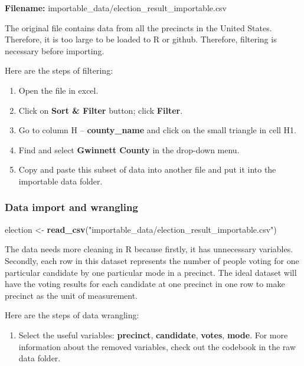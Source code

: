 \documentclass[
]{article}
\newenvironment{Shaded}{\begin{snugshade}}{\end{snugshade}}
\newcommand{\KeywordTok}[1]{\textcolor[rgb]{0.13,0.29,0.53}{\textbf{#1}}}
\newcommand{\NormalTok}[1]{#1}
\newcommand{\StringTok}[1]{\textcolor[rgb]{0.31,0.60,0.02}{#1}}
\providecommand{\tightlist}{%
  \setlength{\itemsep}{0pt}\setlength{\parskip}{0pt}}
\begin{document}
\textbf{Filename:} importable\_data/election\_result\_importable.csv

The original file contains data from all the precincts in the United
States. Therefore, it is too large to be loaded to R or github.
Therefore, filtering is necessary before importing.

Here are the steps of filtering:

\begin{enumerate}
\def\labelenumi{\arabic{enumi}.}
\tightlist
\item
  Open the file in excel.
\item
  Click on \textbf{Sort \& Filter} button; click \textbf{Filter}.
\item
  Go to column H -- \textbf{county\_name} and click on the small
  triangle in cell H1.
\item
  Find and select \textbf{Gwinnett County} in the drop-down menu.
\item
  Copy and paste this subset of data into another file and put it into
  the importable data folder.
\end{enumerate}

\hypertarget{data-import-and-wrangling}{%
\subsubsection{Data import and
wrangling}\label{data-import-and-wrangling}}

\begin{Shaded}
\begin{Highlighting}[]
\NormalTok{election <-}\StringTok{ }\KeywordTok{read_csv}\NormalTok{(}\StringTok{"importable_data/election_result_importable.csv"}\NormalTok{)}
\end{Highlighting}
\end{Shaded}

The data needs more cleaning in R because firstly, it has unnecessary
variables. Secondly, each row in this dataset represents the number of
people voting for one particular candidate by one particular mode in a
precinct. The ideal dataset will have the voting results for each
candidate at one precinct in one row to make precinct as the unit of
measurement.

Here are the steps of data wrangling:

\begin{enumerate}
\def\labelenumi{\arabic{enumi}.}
\tightlist
\item
  Select the useful variables: \textbf{precinct}, \textbf{candidate},
  \textbf{votes}, \textbf{mode}. For more information about the removed
  variables, check out the codebook in the raw data folder.
\end{enumerate}
\end{document}
